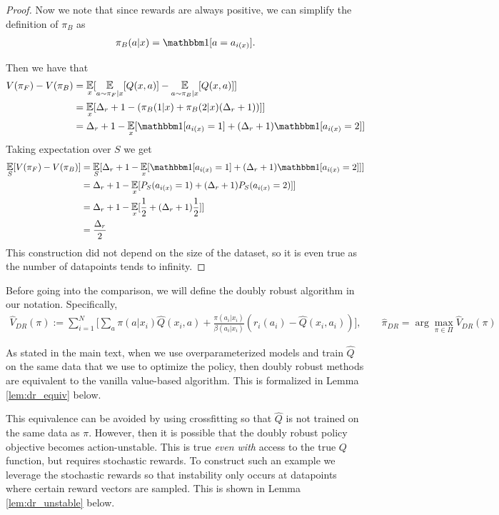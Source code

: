 \begin{proof}
Now we note that since rewards are always positive, we can simplify the definition of $ \pi_B$ as
\begin{align}
    \pi_{B}(a|x) = \one[a = a_{i(x)}].
\end{align}

Then we have that
\begin{align}
    V(\pi_F) - V(\pi_{B}) &= \E_x [\E_{a\sim \pi_F|x}[Q(x,a)] - \E_{a\sim \pi_{B}|x}[Q(x,a)] ]\\
    &= \E_x [\Delta_r + 1 - (\pi_{B}(1|x) + \pi_{B}(2|x) (\Delta_r + 1))] ] \\
    &= \Delta_r + 1 - \E_x[\one[a_{i(x)} = 1] + (\Delta_r + 1)\one[a_{i(x)} = 2]]
\end{align}
Taking expectation over $ S$ we get
\begin{align}
    \E_S[V(\pi_F) - V(\pi_{B})] &= \E_S[\Delta_r + 1 - \E_x[\one[a_{i(x)} = 1] + (\Delta_r + 1)\one[a_{i(x)} = 2]]]\\
    &= \Delta_r + 1 - \E_x[P_S(a_{i(x)} = 1) + (\Delta_r + 1)P_S(a_{i(x)} = 2)]]\\
    &= \Delta_r + 1 - \E_x[\frac{1}{2} + (\Delta_r + 1)\frac{1}{2}]]\\
    &= \frac{\Delta_r}{2}
\end{align}
This construction did not depend on the size of the dataset, so it is even true as the number of datapoints tends to infinity.
\end{proof}



\label{app:dr}


Before going into the comparison, we will define the doubly robust algorithm \cite{dudik2011doubly} in our notation. Specifically,
\begin{align}\label{eq:dr}
    \widehat V_{DR} (\pi) := \sum_{i=1}^N \bigg[ \sum_a \pi(a|x_i) \hat Q(x_i, a) + \frac{\pi(a_i|x_i)}{\beta(a_i|x_i)} (r_i(a_i) - \hat Q(x_i, a_i)) \bigg], \qquad \hat \pi_{DR} = \arg\max_{\pi \in \Pi} \widehat V_{DR}(\pi)
\end{align}

As stated in the main text, when we use overparameterized models and train $ \hat Q$ on the same data that we use to optimize the policy, then doubly robust methods are equivalent to the vanilla value-based algorithm. This is formalized in Lemma \ref{lem:dr_equiv} below.

This equivalence can be avoided by using crossfitting so that $ \hat Q$ is not trained on the same data as $ \pi$. However, then it is possible that the doubly robust policy objective becomes action-unstable. This is true \emph{even with} access to the true $Q$ function, but requires stochastic rewards. To construct such an example we leverage the stochastic rewards so that instability only occurs at datapoints where certain reward vectors are sampled. This is shown in Lemma \ref{lem:dr_unstable} below.

